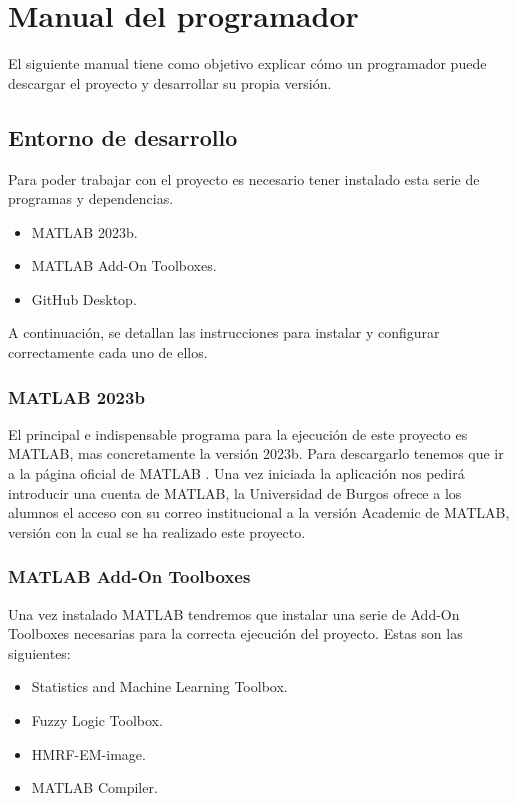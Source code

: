 \section{Manual del programador}\label{manual-del-programador}

El siguiente manual tiene como objetivo explicar cómo un programador puede descargar el proyecto y desarrollar su propia versión.

\subsection{Entorno de desarrollo}\label{entorno-de-desarrollo}

Para poder trabajar con el proyecto es necesario tener instalado esta serie de programas y dependencias.

\begin{itemize}
    \item MATLAB 2023b.
    \item MATLAB Add-On Toolboxes.
    \item GitHub Desktop.
\end{itemize}

A continuación, se detallan las instrucciones para instalar y configurar correctamente cada uno de ellos.

\subsubsection{MATLAB 2023b}\label{matlab-2023b}

El principal e indispensable programa para la ejecución de este proyecto es MATLAB, mas concretamente la versión 2023b. Para descargarlo tenemos que ir a la página oficial de MATLAB \cite{matlab2023b}. Una vez iniciada la aplicación nos pedirá introducir una cuenta de MATLAB, la Universidad de Burgos ofrece a los alumnos el acceso con su correo institucional a la versión Academic de MATLAB, versión con la cual se ha realizado este proyecto.

\subsubsection{MATLAB Add-On Toolboxes}\label{matlab-toolboxes}

Una vez instalado MATLAB tendremos que instalar una serie de Add-On Toolboxes necesarias para la correcta ejecución del proyecto. Estas son las siguientes:

\begin{itemize}
    \item Statistics and Machine Learning Toolbox.
    \item Fuzzy Logic Toolbox.
    \item HMRF-EM-image.
    \item MATLAB Compiler.
\end{itemize}

